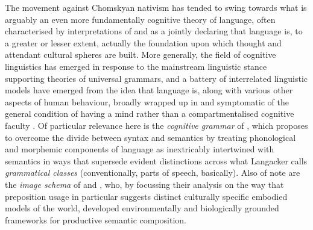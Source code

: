 The movement against Chomskyan nativism has tended to swing towards what is arguably an even more fundamentally cognitive theory of language, often characterised by interpretations of \cite{Sapir1970} and \cite{Whorf2012} as a jointly declaring that language is, to a greater or lesser extent, actually the foundation upon which thought and attendant cultural spheres are built.  More generally, the field of cognitive linguistics has emerged in response to the mainstream linguistic stance supporting theories of universal grammars, and a battery of interrelated linguistic models have emerged from the idea that language is, along with various other aspects of human behaviour, broadly wrapped up in and symptomatic of the general condition of having a mind rather than a compartmentalised cognitive faculty \citep{CroftEA2004}.  Of particular relevance here is the \emph{cognitive grammar} of \cite{Langacker1987}, which proposes to overcome the divide between syntax and semantics by treating phonological and morphemic components of language as inextricably intertwined with semantics in ways that supersede evident distinctions across what Langacker calls \emph{grammatical classes} (conventionally, parts of speech, basically).  Also of note are the \emph{image schema} of \cite{Lakoff1987} and \cite{Johnson1990}, who, by focussing their analysis on the way that preposition usage in particular suggests distinct culturally specific embodied models of the world, developed environmentally and biologically grounded frameworks for productive semantic composition.


